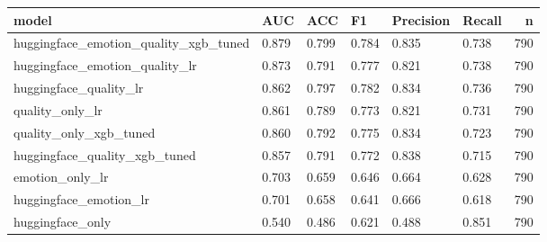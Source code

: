 \begin{tabular}{llllllr}
\toprule
model & AUC & ACC & F1 & Precision & Recall & n \\
\midrule
huggingface\_emotion\_quality\_xgb\_tuned & 0.879 & 0.799 & 0.784 & 0.835 & 0.738 & 790 \\
huggingface\_emotion\_quality\_lr & 0.873 & 0.791 & 0.777 & 0.821 & 0.738 & 790 \\
huggingface\_quality\_lr & 0.862 & 0.797 & 0.782 & 0.834 & 0.736 & 790 \\
quality\_only\_lr & 0.861 & 0.789 & 0.773 & 0.821 & 0.731 & 790 \\
quality\_only\_xgb\_tuned & 0.860 & 0.792 & 0.775 & 0.834 & 0.723 & 790 \\
huggingface\_quality\_xgb\_tuned & 0.857 & 0.791 & 0.772 & 0.838 & 0.715 & 790 \\
emotion\_only\_lr & 0.703 & 0.659 & 0.646 & 0.664 & 0.628 & 790 \\
huggingface\_emotion\_lr & 0.701 & 0.658 & 0.641 & 0.666 & 0.618 & 790 \\
huggingface\_only & 0.540 & 0.486 & 0.621 & 0.488 & 0.851 & 790 \\
\bottomrule
\end{tabular}
